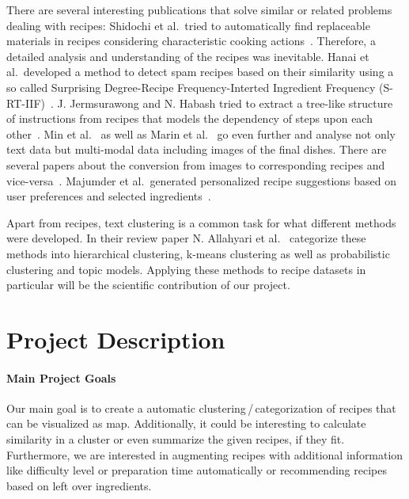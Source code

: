 \documentclass[
     12pt,         %
     a4paper,      %
     BCOR10mm,     %
     DIV14,        %
     ]{article}
\begin{document}
There are several interesting publications that solve similar or related problems dealing with recipes: Shidochi et al.~tried to automatically find replaceable materials in recipes considering characteristic cooking actions~\cite{replaceablematerials}. Therefore, a detailed analysis and understanding of the recipes was inevitable. Hanai et al.~developed a method to detect spam recipes based on their similarity using a so called Surprising Degree-Recipe Frequency-Interted Ingredient Frequency (S-RT-IIF)~\cite{recipesspam}. J. Jermsurawong and N. Habash tried to extract a tree-like structure of instructions from recipes that models the dependency of steps upon each other~\cite{recipestructure}. Min et al.~\cite{multimodal} as well as Marin et al.~\cite{marin2019recipe1m} go even further and analyse not only text data but multi-modal data including images of the final dishes. There are several papers about the conversion from images to corresponding recipes and vice-versa~\cite{marin2019recipe1m, 8099810}. Majumder et al.~generated personalized recipe suggestions based on user preferences and selected ingredients~\cite{majumder-etal-2019-generating}.

Apart from recipes, text clustering is a common task for what different methods were developed. In their review paper N. Allahyari et al.~\cite{clusteringreview} categorize these methods into hierarchical clustering, k-means clustering as well as probabilistic clustering and topic models. Applying these methods to recipe datasets in particular will be the scientific contribution of our project.




\section{Project Description}
\label{sec:project}

\paragraph{Main Project Goals} Our main goal is to create a automatic clustering\,/\,categorization  of recipes that can be visualized as map.  Additionally, it could be interesting to calculate similarity in a cluster or even summarize the given recipes, if they fit. Furthermore, we are interested in augmenting recipes with 
additional information like difficulty level or preparation time automatically or recommending recipes based on left over ingredients.
\end{document}
